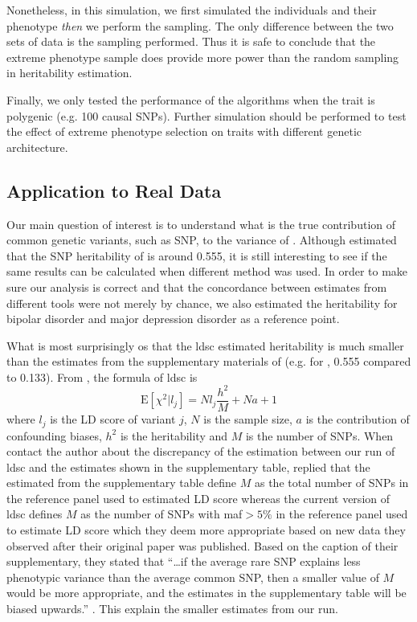 	Nonetheless, in this simulation, we first simulated the individuals and their phenotype \emph{then} we perform the sampling.
	The only difference between the two sets of data is the sampling performed.
	Thus it is safe to conclude that the extreme phenotype sample does provide more power than the random sampling in heritability estimation.
		
	Finally, we only tested the performance of the algorithms when the trait is polygenic (e.g. 100 causal \glspl{SNP}).
	Further simulation should be performed to test the effect of extreme phenotype selection on traits with different genetic architecture. 
	
	\subsection{Application to Real Data}
	Our main question of interest is to understand what is the true contribution of common genetic variants, such as \gls{SNP}, to the variance of .
	Although \citet{Bulik-Sullivan2015c} estimated that the \gls{SNP} heritability of  is around 0.555, it is still interesting to see if the same results can be calculated when different method was used. 
	In order to make sure our analysis is correct and that the concordance between estimates from different tools were not merely by chance, we also estimated the heritability for bipolar disorder and major depression disorder as a reference point.
	
	What is most surprisingly os that the \gls{ldsc} estimated heritability is much smaller than the estimates from the supplementary materials of \citet{Bulik-Sullivan2015} (e.g. for , 0.555 compared to 0.133).
	From \citet{Bulik-Sullivan2015}, the formula of \gls{ldsc} is
	\begin{equation}
		\mathrm{E}[\chi^2|l_j] = Nl_j\frac{h^2}{M}+Na+1
	\end{equation}
	where $l_j$ is the \gls{LD} score of variant $j$, $N$ is the sample size, $a$ is the contribution of confounding biases, $h^2$ is the heritability and $M$ is the number of \glspl{SNP}.
	When contact the author about the discrepancy of the estimation between our run of \gls{ldsc} and the estimates shown in the supplementary table, \citet{Bulik-Sullivan2015c} replied that the estimated from the supplementary table define $M$ as the total number of \glspl{SNP} in the reference panel used to estimated \gls{LD} score whereas the current version of \gls{ldsc} defines $M$ as the number of \glspl{SNP} with \gls{maf}$ >5\%$ in the reference panel used to estimate \gls{LD} score which they deem more appropriate based on new data they observed after their original paper was published.
	Based on the caption of their supplementary, they stated that ``\dots if the average rare \gls{SNP} explains less phenotypic variance than the average common \gls{SNP}, then a smaller value of $M$ would be more appropriate, and the estimates in the supplementary table will be biased upwards.'' \citep{Bulik-Sullivan2015}.
	This explain the smaller estimates from our run. 
	
